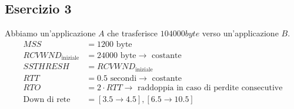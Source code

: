 \documentclass[a4paper]{article}
\begin{document}
\subsection{Esercizio 3}
Abbiamo un'applicazione \( A \) che trasferisce \( 104000byte \) verso un'applicazione \( B \).
\[
\begin{aligned}
  MSS &= 1200 \text{ byte}\\
  RCVWND_{\text{iniziale}} &= 24000 \text{ byte} \to \text{ costante}\\
  SSTHRESH &= RCVWND_{\text{iniziale}}\\
  RTT &= 0.5 \text{ secondi} \to \text{ costante}\\
  RTO &= 2 \cdot RTT \to \text{ raddoppia in caso di perdite consecutive}\\
  \text{Down di rete} &= [3.5 \to 4.5],[6.5 \to 10.5]
\end{aligned}
\] 
\end{document}
